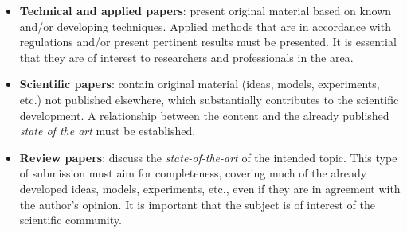 \documentclass[12pt, a4paper, twoside, twocolumn]{article}
\begin{document}
\begin{itemize}[noitemsep,topsep=-1ex] \itemsep=7pt
	\item \textbf{Technical and applied papers}: present original material based on known and/or developing techniques. Applied methods that are in accordance with regulations and/or present pertinent results must be presented. It is essential that they are of interest to researchers and professionals in the area. 
	
	\item \textbf{Scientific papers}: contain original material (ideas, models, experiments, etc.) not published elsewhere, which substantially contributes to the scientific development. A relationship between the content and the already published \textit{state of the art} must be established.
	
    \item \textbf{Review papers}: discuss the \textit{state-of-the-art} of the intended topic. This type of submission must aim for completeness, covering much of the already developed ideas, models, experiments, etc., even if they are in agreement with the author's opinion. It is important that the subject is of interest of the scientific community.
\end{itemize}
\end{document}
